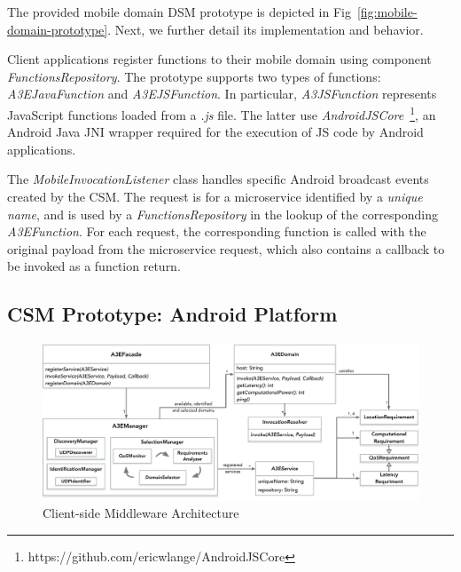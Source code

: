 The provided mobile domain DSM prototype is depicted in Fig~\ref{fig:mobile-domain-prototype}. Next, we further detail its implementation and behavior.

Client applications register functions to their mobile domain using component \textit{FunctionsRepository}. The prototype supports two types of functions: \textit{A3EJavaFunction} and \textit{A3EJSFunction}. In particular, \textit{A3JSFunction} represents JavaScript functions loaded from a \textit{.js} file. The latter use \textit{AndroidJSCore}~\footnote{https://github.com/ericwlange/AndroidJSCore}, an Android Java JNI wrapper required for the execution of JS code by Android applications.

The \textit{MobileInvocationListener} class handles specific Android broadcast events created by the CSM. The request is for a microservice identified by a \textit{unique name}, and is used by a \textit{FunctionsRepository} in the lookup of the corresponding \textit{A3EFunction}. For each request, the corresponding function is called with the original payload from the microservice request, which also contains a callback to be invoked as a function return.


\subsection{CSM Prototype: Android Platform}



\begin{figure}[tbp]
	\includegraphics[width=1\textwidth]{figs/a3e-mobile-prototype}
	\caption{Client-side Middleware Architecture}
	\label{fig:mobile-prototype}
\end{figure}

